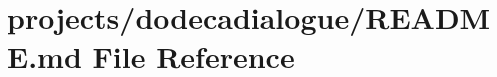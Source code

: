 \hypertarget{projects_2dodecadialogue_2README_8md}{}\section{projects/dodecadialogue/\+R\+E\+A\+D\+ME.md File Reference}
\label{projects_2dodecadialogue_2README_8md}

